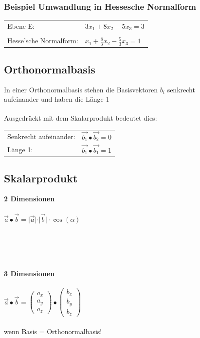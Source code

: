 		    \subsubsection{Beispiel Umwandlung in Hessesche Normalform}
		    \begin{tabular}{ll}
		    Ebene E: & $3 x_1 + 8 x_2 - 5 x_3 = 3$ \\
		    \\
		    Hesse'sche Normalform: & $x_1 + \frac{8}{3} x_2 - \frac{5}{3} x_3 = 1$
		    \end{tabular}
		    
			
			\subsection{Orthonormalbasis}
			In einer Orthonormalbasis stehen die Basisvektoren $b_i$ senkrecht \\
			aufeinander und haben die Länge 1 \\
			\\
			Ausgedrückt mit dem Skalarprodukt bedeutet dies: \\
			\begin{tabular}{ll}
			Senkrecht aufeinander: & $\vec{b_1} \bullet \vec{b_2} = 0$ \\
			Länge 1: & $\vec{b_1} \bullet \vec{b_1} = 1$
			\end{tabular}
		  
		   
			\subsection{Skalarprodukt}
			
			\begin{minipage}{0.4\linewidth}
			\textbf{2 Dimensionen} \\
			\\
			$\vec{a} \bullet \vec{b} = \vert \vec{a} \vert \cdot \vert \vec{b} \vert \cdot \cos(\alpha)$ \\
			\\
			\\
			\\
			\\
			\end{minipage}
			\hfill
			\begin{minipage}{0.58\linewidth}
			\textbf{3 Dimensionen} \\
			\\
			$\vec{a} \bullet \vec{b} = \begin{pmatrix} a_x \\ a_y \\ a_z \end{pmatrix} \bullet \begin{pmatrix} b_x \\ b_y \\ b_z \end{pmatrix}$ \\
			\\
			wenn Basis = Orthonormalbasis!\\
			\end{minipage}
			
